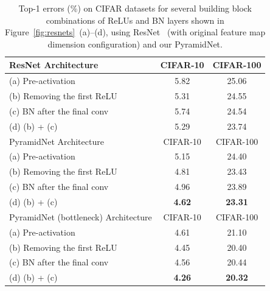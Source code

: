 \documentclass[10pt,twocolumn,letterpaper]{article}
\begin{document}
\begin{table}[t]
\fontsize{7}{8}\selectfont
\begin{center}
\begin{tabular}{|l|c|c|}
\hline
ResNet Architecture  & CIFAR-10 & CIFAR-100\\
\hline
(a) Pre-activation~\cite{preresnet} & 5.82 & 25.06\\
(b) Removing the first ReLU & 5.31 & 24.55\\
(c) BN after the final conv & 5.74 & 24.54 \\
(d) (b) + (c) & 5.29 & 23.74 \\
\hline\hline
PyramidNet Architecture & CIFAR-10 & CIFAR-100\\
\hline
(a) Pre-activation~\cite{preresnet} & 5.15 & 24.40\\
(b) Removing the first ReLU & 4.81 & 23.43\\
(c) BN after the final conv & 4.96 & 23.89\\
(d) (b) + (c) & {\bf4.62} & {\bf23.31}\\
\hline\hline
PyramidNet (bottleneck) Architecture  & CIFAR-10 & CIFAR-100\\
\hline
(a) Pre-activation~\cite{preresnet} & 4.61 & 21.10\\
(b) Removing the first ReLU  & 4.45 & 20.40\\
(c) BN after the final conv & 4.56 & 20.44\\
(d) (b) + (c)  & {\bf4.26} & {\bf20.32}\\
\hline
\end{tabular}
\end{center}
\caption{Top-1 errors (\%) on CIFAR datasets for several building block combinations of ReLUs and BN layers shown in Figure~\ref{fig:resnets}~(a)--(d), using ResNet~\cite{preresnet} (with original feature map dimension configuration) and our PyramidNet.}
\label{table:compare}
\vspace{-3mm}
\end{table}
\end{document}
